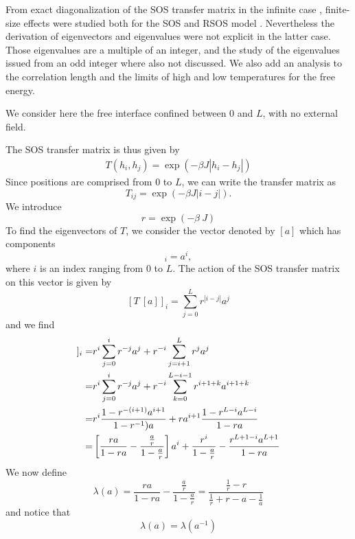 {\color{blue}
From exact diagonalization of the SOS transfer matrix in the infinite case \cite{guyer_sine-gordon_1979}, finite-size effects were studied both for the SOS and RSOS model \cite{svrakic_finite-size_1988,privman_finite-size_1988}. Nevertheless the derivation of eigenvectors and eigenvalues were not explicit in the latter case. Those eigenvalues are a multiple of an integer, and the study of the eigenvalues issued from an odd integer where also not discussed. We also add an analysis to the correlation length and the limits of high and low temperatures for the free energy. 

We consider here the free interface confined between $0$ and $L$, with no external field.} {\color{red} The SOS transfer matrix is thus given by 
\begin{align}
T(h_i,h_j) = \exp(-\beta J |h_i-h_j|)
\end{align}
Since positions are comprised from $0$ to $L$, we can write the transfer matrix as}
\begin{equation}
T_{ij} = \exp(-\beta J|i-j|).
\end{equation}
We introduce 
\begin{equation}
r=\exp(-\beta\ J)
\end{equation}
To find the eigenvectors of $T$, we consider the vector denoted by $[a]$ which has components
\begin{equation}
[a]_i = a^i,
\end{equation}
where $i$ is an index ranging from $0$ to $L$. 
The action of the SOS transfer matrix on this vector is given by
\begin{equation}
\left[T\ [a]\right]_i = \sum_{j=0}^L r^{ |i-j|} a^j
\end{equation}
and we find
\begin{align}
[T\ [a]]_i
=& r^i \sum_{j=0}^i r^{-j} a^j + r^{-i} \sum_{j= i+1}^L r^j a^j \nn
=& r^i \sum_{j=0}^i r^{-j} a^j + r^{-i} \sum_{k= 0}^{L-i-1} r^{i+1+k} a^{i+1+k} \nn
=& r^i \frac{1- r^{-(i+1)} a^{i+1}}{1- r^{-1} )a} + r a^{i+1}\frac{1- r^{L-i} a^{L-i}}{1- r a} \nn
=&\left[\frac{ ra}{1-ra}- \frac{ \frac{a}{r}}{1-\frac{a}{r}}\right]a^i +\frac{r^i}{1-\frac{a}{r}}-\frac{r^{L+1-i}a^{L+1}}{1-ra}
\end{align}
We now define
\begin{equation}
\lambda(a)= \frac{ ra}{1-ra}- \frac{ \frac{a}{r}}{1-\frac{a}{r}} = \frac{\frac{1}{r}-r}{\frac{1}{r}+r
- a-\frac{1}{a}}
\label{elam}
\end{equation}
and notice that
\begin{equation}
\lambda(a) = \lambda(a^{-1})
\end{equation}
